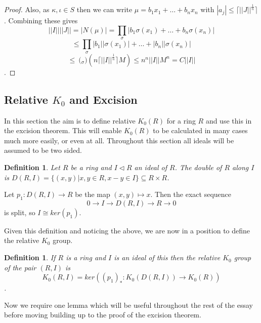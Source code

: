 \documentclass[a4paper,10pt]{article}
\newtheorem{defn}[thm]{Definition}
\begin{document}
\begin{proof}
Also, as $\kappa,\iota \in S$ then we can write $\mu = b_{1}x_{1}+\ldots +b_{n}x_{n}$ with $|a_{j}|\leq \lceil ||J||^{\frac{1}{n}}\rceil$. Combining these gives $$||I||||J||=|N(\mu )| = \prod_{\sigma}|b_{1}\sigma(x_{1})+\ldots +b_{n}\sigma (x_{n})|$$ $$\leq \prod_{\sigma}|b_{1}||\sigma(x_{1})|+\ldots +|b_{n}||\sigma(x_{n})|$$ $$\leq \pod_{\sigma}(n\lceil ||I||^{\frac{1}{n}}\rceil M)\leq n^{n}||I||M^{n}=C||I||$$.
\end{proof}


\subsection{Relative $K_{0}$ and Excision}

In this section the aim is to define relative $K_{0}(R)$ for a ring $R$ and use this in the excision theorem. This will enable $K_{0}(R)$ to be calculated in many cases much more easily, or even at all. Throughout this section all ideals will be assumed to be two sided.

\begin{defn}
Let $R$ be a ring and $I\triangleleft R$ an ideal of $R$. The double of $R$ along $I$ is $D(R,I)=\{(x,y)|x,y\in R,x-y\in I\}\subseteq R\times R$.
\end{defn}

Let $p_{1}:D(R,I)\rightarrow R$ be the map $(x,y)\mapsto x$. Then the exact sequence $$0\rightarrow I\rightarrow D(R,I)\rightarrow R\rightarrow 0$$ is split, so $I\cong ker(p_{1})$.

Given this definition and noticing the above, we are now in a position to define the relative $K_{0}$ group.

\begin{defn}
If $R$ is a ring and $I$ is an ideal of this then the relative $K_{0}$ group of the pair $(R,I)$ is $$K_{0}(R,I)=ker((p_{1})_{*}:K_{0}(D(R,I))\rightarrow K_{0}(R))$$.
\end{defn}

Now we require one lemma which will be useful throughout the rest of the essay before moving building up to the proof of the excision theorem.
\end{document}
